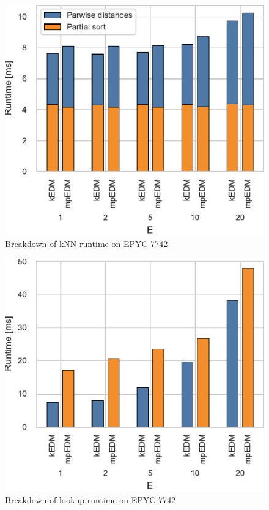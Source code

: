 \documentclass[conference]{IEEEtran}
\begin{document}
\begin{figure}
    \centering
    \includegraphics{figs/breakdown_knn_epyc}
    \caption{Breakdown of kNN runtime on EPYC 7742}%
    \label{fig:architecture}
\end{figure}

\begin{figure}
    \centering
    \includegraphics{figs/runtime_lookup_epyc}
    \caption{Breakdown of lookup runtime on EPYC 7742}%
    \label{fig:architecture}
\end{figure}
\end{document}

